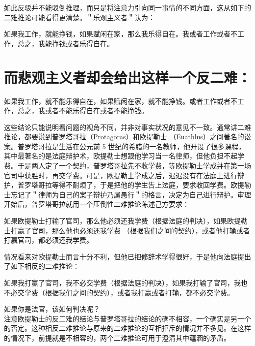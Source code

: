 如此反驳并不能驳倒推理，而只是将注意力引向同一事情的不同方面，这从如下的二难推论可能看得更清楚。＂乐观主义者＂认为：

如果我工作，就能挣钱，如果赋闲在家，那么我乐得自在。我或者工作或者不工作，总之，我能挣钱或者乐得自在。

\section*{而悲观主义者却会给出这样一个反二难：}
如果我工作，就不能乐得自在，如果赋闲在家，就不能挣钱。或者工作或者不工作，总之，我或者不能乐得自在或者不能挣钱。

这些结论只能说明看问题的视角不同，并非对事实状况的意见不一致。通常讲二难推论，都要说到普罗塔哥拉（Protagoras）和欧提勒士 （Euathlus）之间著名的讼案。普罗塔哥拉是生活在公元前 5 世纪的希腊的一名教师，他开设了很多课程，其中最著名的是法庭辩护术，欧提勒士想跟他学习当一名律师，但他负担不起学费。于是两人定了一个契约，普罗塔哥拉先不收学费，等欧提勒士学成并在第一场官司中获胜时，再交学费。可是，欧提勒士学成之后，迟迟没有在法庭上进行辩护，普罗塔哥拉等得不耐烦了，于是把他的学生告上法庭，要求收回学费。欧提勒士忘记了＂律师为自己的案子辩护乃属愚行＂的格言，决定为自己进行辩护。审理开始后，普罗塔哥拉就用一个压倒性二难推论陈述己方要求：

如果欧提勒士打输了官司，那么他必须还我学费（根据法庭的判决），如果欧提勒士打赢了官司，那么他也必须还我学费 （根据我们之间的契约），或者他打输或者打赢官司，都必须还我学费。

情况看来对欧提勒士而言十分不利，但他已把修辞术学得很好，于是他向法庭提出了如下相反的二难推论：

如果我打赢了官司，我不必交学费（根据法庭的判决），如果我打输了官司，我也不必交学费（根据我们之间的契约），或者我打赢或者打输，都不必交学费。

如果你是法官，该如何判决呢？\\
注意欧提勒士的反二难的结论与普罗塔哥拉的结论的确不相容，一个确实是另一个的否定。这种相反二难推论与原来的二难推论的互相拒斥的情况并不多见。在这样的情况下，前提就是不相容的，两个二难推论可用于澄清其中蕴涵的矛盾。 